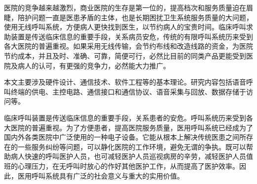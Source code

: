 医{\cf}院的{\cf}竞争{\cf}越来{\cf}越激{\cf}烈，{\cf}商业{\cf}医院{\cf}的生{\cf}存是{\cf}第一{\cf}位的{\cf}，提{\cf}高档{\cf}次和{\cf}服务{\cf}质量{\cf}迫在{\cf}眉睫{\cf}，陪{\cf}护问{\cf}题一{\cf}直是{\cf}医患{\cf}矛盾{\cf}的主{\cf}体，{\cf}也是{\cf}长期{\cf}困扰{\cf}卫生{\cf}系统{\cf}服务{\cf}质量{\cf}的大{\cf}问题{\cf}，使{\cf}用无{\cf}线呼{\cf}叫系{\cf}统，{\cf}方便{\cf}病人{\cf}更快{\cf}找到{\cf}医生{\cf}，以{\cf}节约{\cf}病人{\cf}的宝{\cf}贵时{\cf}间。{\cf}临床{\cf}呼叫{\cf}求助{\cf}装置{\cf}是传{\cf}送临{\cf}床信{\cf}息的{\cf}重要{\cf}手段{\cf}，关{\cf}系病{\cf}员安{\cf}危，{\cf}传统{\cf}的有{\cf}限呼{\cf}叫系{\cf}统历{\cf}来受{\cf}到各{\cf}大医{\cf}院的{\cf}普遍{\cf}重视{\cf}。如{\cf}果采{\cf}用无{\cf}线传{\cf}输，{\cf}会节{\cf}约布{\cf}线和{\cf}改造{\cf}线路{\cf}的资{\cf}金，{\cf}为医{\cf}院节{\cf}约成{\cf}本，{\cf}并且{\cf}及时{\cf}、准{\cf}确、{\cf}可靠{\cf}，简{\cf}便可{\cf}行，{\cf}必然{\cf}比目{\cf}前的{\cf}同类{\cf}产品{\cf}更能{\cf}受到{\cf}医院{\cf}及病{\cf}人的{\cf}认可{\cf}，有{\cf}更强{\cf}的竞{\cf}争力{\cf}，必{\cf}然能{\cf}大力推广。

本{\cf}文主{\cf}要涉{\cf}及硬{\cf}件设{\cf}计、{\cf}通信{\cf}技术{\cf}、软{\cf}件工{\cf}程等{\cf}的基{\cf}本理{\cf}论。{\cf}研究{\cf}内容{\cf}包括{\cf}语音{\cf}呼叫{\cf}终端{\cf}的供{\cf}电、{\cf}主控{\cf}电路{\cf}、通{\cf}信接{\cf}口和{\cf}通信{\cf}协议{\cf}、语{\cf}音采{\cf}集与{\cf}回放{\cf}、数{\cf}据存{\cf}储于{\cf}访问等。

临{\cf}床呼{\cf}叫装{\cf}置是{\cf}传送{\cf}临床{\cf}信息{\cf}的重{\cf}要手{\cf}段，{\cf}关系{\cf}患者{\cf}的安{\cf}危。{\cf}呼叫{\cf}系统{\cf}历来{\cf}受到{\cf}各大{\cf}医院{\cf}的普{\cf}遍重{\cf}视。{\cf}为了{\cf}方便{\cf}患者{\cf}，提{\cf}高医{\cf}院服{\cf}务质{\cf}量，{\cf}医用{\cf}呼叫{\cf}系统{\cf}已经{\cf}成为{\cf}了国{\cf}内外{\cf}各类{\cf}医院{\cf}中广{\cf}泛使{\cf}用的{\cf}一种{\cf}电子{\cf}设备{\cf}。它{\cf}能从{\cf}根本{\cf}上解{\cf}决传{\cf}统医{\cf}患之{\cf}间所{\cf}存在{\cf}的一{\cf}些服{\cf}务纠{\cf}纷等{\cf}问题{\cf}，可{\cf}以静{\cf}化医{\cf}院的{\cf}工作{\cf}环境{\cf}，避{\cf}免无{\cf}谓的{\cf}争执{\cf}。既{\cf}可以{\cf}帮助{\cf}病人{\cf}快速{\cf}的呼{\cf}叫医{\cf}护人{\cf}员，{\cf}也可{\cf}减轻{\cf}医护{\cf}人员{\cf}巡视{\cf}病房{\cf}的辛{\cf}劳，{\cf}减轻{\cf}医护{\cf}人员{\cf}值班{\cf}的心{\cf}理压{\cf}力，{\cf}在无{\cf}呼叫{\cf}时放{\cf}心的{\cf}作好{\cf}其他{\cf}医护{\cf}工作{\cf}，从{\cf}而提{\cf}高了{\cf}医护{\cf}效率{\cf}。因{\cf}此，{\cf}医用{\cf}呼叫{\cf}系统{\cf}具有{\cf}广泛{\cf}的社{\cf}会意{\cf}义与{\cf}重大{\cf}的实{\cf}用价{\cf}值。

